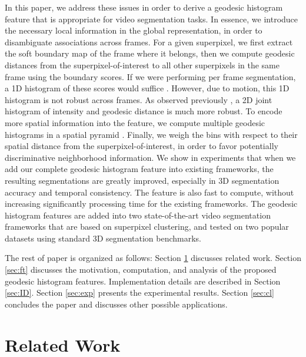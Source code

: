 \documentclass[runningheads]{llncs}
\begin{document}
In this paper, we address these issues in order to derive a geodesic histogram feature that is appropriate for video segmentation tasks. In essence, we introduce the necessary local information in the global representation, in order to disambiguate associations across frames. For a given superpixel, we first extract the soft boundary map of the frame where it belongs, then we compute geodesic distances from the superpixel-of-interest to all other superpixels in the same frame using the boundary scores. If we were performing per frame segmentation, a 1D histogram of these scores would suffice \cite{Bai:4408931}. However, due to motion, this 1D histogram is not robust across frames. As observed  previously \cite{geohis}, a 2D joint histogram of intensity and geodesic distance is much more robust. To encode more spatial information into the feature, we compute multiple  geodesic histograms in a spatial pyramid \cite{1641019}. Finally, we weigh the bins with respect to their spatial distance from the superpixel-of-interest, in order to favor potentially discriminative neighborhood information. We show in experiments that when we add our complete geodesic histogram feature into existing frameworks, the resulting segmentations are greatly improved, especially in 3D segmentation accuracy and temporal consistency. The feature is also fast to compute, without increasing significantly processing time for the existing frameworks. The geodesic histogram features are added into two state-of-the-art video segmentation frameworks that are based on superpixel clustering, and tested on two popular datasets using standard 3D segmentation benchmarks.



The rest of paper is organized as follows: Section \ref{sec:rw} discusses related work. Section \ref{sec:ft} discusses the motivation, computation, and analysis of the proposed geodesic histogram features. Implementation details are described in Section \ref{sec:ID}. Section \ref{sec:exp} presents the experimental results. Section \ref{sec:cl}  concludes the paper and discusses other possible applications.






\section{Related Work}

\label{sec:rw}
 
\end{document}

